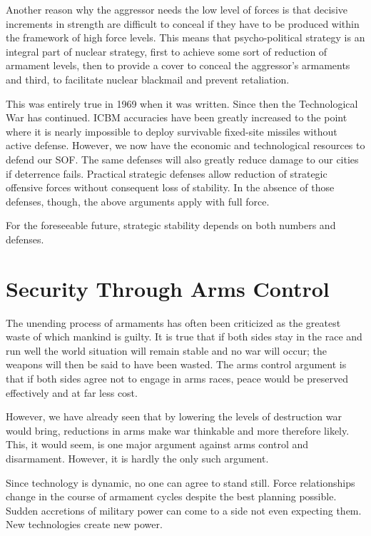 Another reason why the aggressor needs the low level of forces is that decisive increments in strength are difficult to conceal if they have to be produced within the framework of high force levels. This means that psycho-political strategy is an integral part of nuclear strategy, first to achieve some sort of reduction of armament levels, then to provide a cover to conceal the aggressor's armaments and third, to facilitate nuclear blackmail and prevent retaliation.

\begin{mdframed}[backgroundcolor=black!10]
This was entirely true in 1969 when it was written. Since then the Technological War has continued. ICBM accuracies have been greatly increased to the point where it is nearly impossible to deploy survivable fixed-site missiles without active defense.
However, we now have the economic and technological resources to defend our SOF. The same defenses will also greatly reduce damage to our cities if deterrence fails. Practical strategic defenses allow reduction of strategic offensive forces without consequent loss of stability. In the absence of those defenses, though, the above arguments apply with full force.
\end{mdframed}

For the foreseeable future, strategic stability depends on both numbers and defenses.

\section{Security Through Arms Control}
The unending process of armaments has often been criticized as the greatest waste of which mankind is guilty. It is true that if both sides stay in the race and run well the world situation will remain stable and no war will occur; the weapons will then be said to have been wasted. The arms control argument is that if both sides agree not to engage in arms races, peace would be preserved effectively and at far less cost.

However, we have already seen that by lowering the levels of destruction war would bring, reductions in arms make war thinkable and more therefore likely. This, it would seem, is one major argument against arms control and disarmament. However, it is hardly the only such argument.

Since technology is dynamic, no one can agree to stand still. Force relationships change in the course of armament cycles despite the best planning possible. Sudden accretions of military power can come to a side not even expecting them. New technologies create new power.

